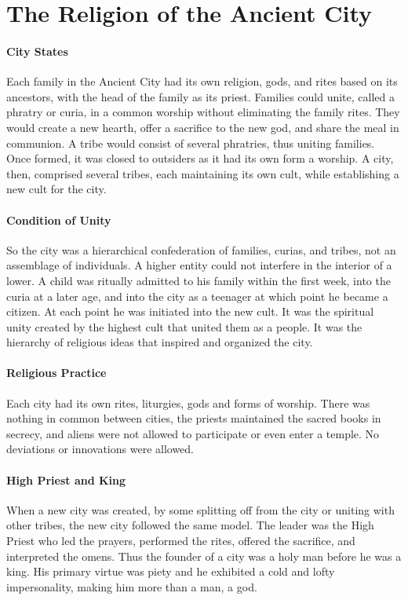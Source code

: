 \section{The Religion of the Ancient City}

\label{sec:ReligionAncientCity}

\paragraph{City States}
Each family in the Ancient City had its own religion, gods, and rites based on its ancestors, with the head of the family as its priest. Families could unite, called a phratry or curia, in a common worship without eliminating the family rites. They would create a new hearth, offer a sacrifice to the new god, and share the meal in communion. A tribe would consist of several phratries, thus uniting families. Once formed, it was closed to outsiders as it had its own form a worship. A city, then, comprised several tribes, each maintaining its own cult, while establishing a new cult for the city.

\paragraph{Condition of Unity}
So the city was a hierarchical confederation of families, curias, and tribes, not an assemblage of individuals. A higher entity could not interfere in the interior of a lower. A child was ritually admitted to his family within the first week, into the curia at a later age, and into the city as a teenager at which point he became a citizen. At each point he was initiated into the new cult. It was the spiritual unity created by the highest cult that united them as a people. It was the hierarchy of religious ideas that inspired and organized the city.

\paragraph{Religious Practice}
Each city had its own rites, liturgies, gods and forms of worship. There was nothing in common between cities, the priests maintained the sacred books in secrecy, and aliens were not allowed to participate or even enter a temple. No deviations or innovations were allowed.

\paragraph{High Priest and King}
When a new city was created, by some splitting off from the city or uniting with other tribes, the new city followed the same model. The leader was the High Priest who led the prayers, performed the rites, offered the sacrifice, and interpreted the omens. Thus the founder of a city was a holy man before he was a king. His primary virtue was piety and he exhibited a cold and lofty impersonality, making him more than a man, a god.

